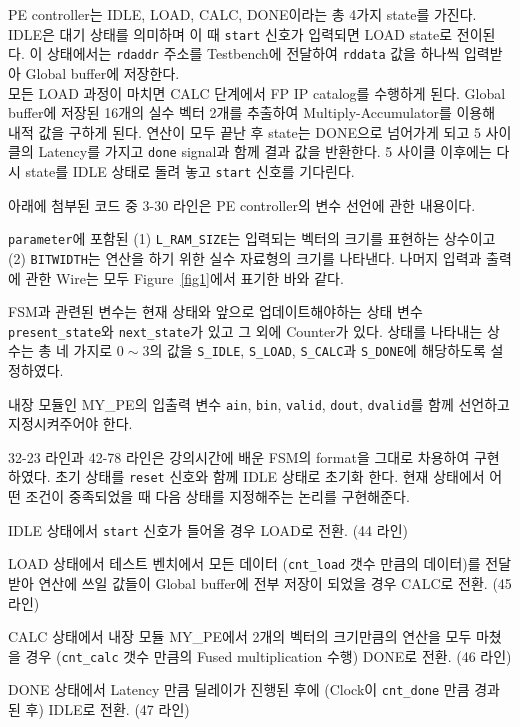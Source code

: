 \documentclass{article}
\begin{document}
PE controller는 IDLE, LOAD, CALC, DONE이라는 총 4가지 state를 가진다. IDLE은 대기 상태를 의미하며 이 때 
\texttt{start} 신호가 입력되면 LOAD state로 전이된다. 이 상태에서는 \texttt{rdaddr} 주소를 Testbench에 전달하여 \texttt{rddata} 값을 하나씩 입력받아 Global buffer에 저장한다.\\

모든 LOAD 과정이 마치면 CALC 단계에서 FP IP catalog를 수행하게 된다. Global buffer에 저장된 16개의 실수 벡터 2개를 추출하여 Multiply-Accumulator를 이용해 내적 값을 구하게 된다. 연산이 모두 끝난 후 state는 DONE으로 넘어가게 되고 5 사이클의 Latency를 가지고 \texttt{done} signal과 함께 결과 값을 반환한다. 5 사이클 이후에는 다시 state를 IDLE 상태로 돌려 놓고 \texttt{start} 신호를 기다린다.\\

\begin{itemize*}
\item 아래에 첨부된 코드 중 3-30 라인은 PE controller의 변수 선언에 관한 내용이다.
\begin{itemize*}
\item \texttt{parameter}에 포함된 (1) \texttt{L\_RAM\_SIZE}는 입력되는 벡터의 크기를 표현하는 상수이고 (2) \texttt{BITWIDTH}는 연산을 하기 위한 실수 자료형의 크기를 나타낸다. 나머지 입력과 출력에 관한 Wire는 모두 Figure~\ref{fig1}에서 표기한 바와 같다. 
\item FSM과 관련된 변수는 현재 상태와 앞으로 업데이트해야하는 상태 변수 \texttt{present\_state}와 \texttt{next\_state}가 있고 그 외에 Counter가 있다. 상태를 나타내는 상수는 총 네 가지로 $0 \sim 3$의 값을 \texttt{S\_IDLE}, \texttt{S\_LOAD}, \texttt{S\_CALC}과 \texttt{S\_DONE}에 해당하도록 설정하였다.
\item 내장 모듈인 MY\_PE의 입출력 변수 \texttt{ain}, \texttt{bin}, \texttt{valid}, \texttt{dout}, \texttt{dvalid}를 함께 선언하고 지정시켜주어야 한다.
\end{itemize*}

\item 32-23 라인과 42-78 라인은 강의시간에 배운 FSM의 format을 그대로 차용하여 구현하였다. 초기 상태를 \texttt{reset} 신호와 함께 IDLE 상태로 초기화 한다. 현재 상태에서 어떤 조건이 중족되었을 때 다음 상태를 지정해주는 논리를 구현해준다.
\begin{itemize*}
\item IDLE 상태에서 \texttt{start} 신호가 들어올 경우 LOAD로 전환. (44 라인)
\item LOAD 상태에서 테스트 벤치에서 모든 데이터 (\texttt{cnt\_load} 갯수 만큼의 데이터)를 전달받아 연산에 쓰일 값들이 Global buffer에 전부 저장이 되었을 경우 CALC로 전환. (45 라인)
\item CALC 상태에서 내장 모듈 MY\_PE에서 2개의 벡터의 크기만큼의 연산을 모두 마쳤을 경우 (\texttt{cnt\_calc} 갯수 만큼의 Fused multiplication 수행) DONE로 전환. (46 라인)
\item DONE 상태에서 Latency 만큼 딜레이가 진행된 후에 (Clock이 \texttt{cnt\_done} 만큼 경과된 후) IDLE로 전환. (47 라인)
\end{itemize*}


\end{itemize*}
\end{document}
